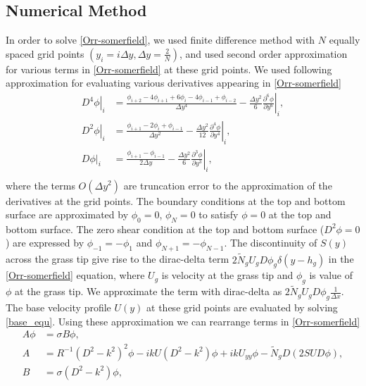 \documentclass[12pt]{report}   %
\newcommand{\del}{\partial}
\newcommand{\Rey}{{R}}
\newcommand{\Ndg}{\tilde{N}_g}
\begin{document}
\subsection{Numerical Method}
  In order to solve \eqref{Orr-somerfield}, we used finite difference method with $N$ equally spaced grid points $(y_i = i\Delta y, \Delta y = \frac{2}{N})$, and used second order approximation for various terms in \eqref{Orr-somerfield} at these grid points. We used following approximation for evaluating various derivatives appearing in \eqref{Orr-somerfield}
  \begin{equation}
  \begin{align}
    \left.{ D^4\phi} \right|_i &= \frac{ \phi_{i+2}-4\phi_{i+1}+6\phi_{i}-4\phi_{i-1}+\phi_{i-2} }{\Delta y^4} - \frac{\Delta y^2}{6} \left. \frac{\del^6 \phi}{\del y^6} \right |_i, \\
    \left. D^2\phi \right|_i &=  \frac{\phi_{i+1} -2\phi_i +\phi_{i-1}}{\Delta y^2} - \left. \frac{\Delta y^2}{12} \frac{\del^4 \phi}{\del y^4} \right|_i ,\\    
    \left. D\phi \right|_i &=  \frac{\phi_{i+1} -\phi_{i-1}}{2\Delta y} - \left. \frac{\Delta y^2}{6} \frac{\del^3 \phi}{\del y^3} \right|_i, \\
    \end{align}
  \end{equation}
where the terms $O(\Delta y^2)$ are truncation error to the approximation of the derivatives at the grid points.
The boundary conditions at the top and bottom surface are approximated by $\phi_0 = 0$,  $\phi_{N} = 0$ to satisfy $\phi=0$ at the top and bottom surface.
The zero shear condition at the top and bottom surface ($D^2\phi=0$) are expressed by $\phi_{-1} = -\phi_{1}$ and $\phi_{N+1} = -\phi_{N-1}$. The discontinuity of $S(y)$ across the grass tip give rise to the dirac-delta term $2\Ndg U_g D\phi_g \delta(y-h_g)$ in the \ref{Orr-somerfield} equation, where $U_g$ is velocity at the grass tip and $\phi_g$ is value of $\phi$ at the grass tip. We approximate the term with dirac-delta as $2\Ndg U_g D\phi_{g} \frac{1}{\Delta x}$.
The base velocity profile $U(y)$ at these grid points are evaluated by solving \eqref{base_equ}. Using these approximation we can rearrange terms in \eqref{Orr-somerfield} 
\begin{equation}
\begin{split}
A\phi &= \sigma B \phi,\\
A &= \Rey^{-1}\left(D^2 -k^{2} \right)^2\phi-ikU \left(D^2-k^2\right)\phi + ik U_{yy}\phi -\Ndg D\left(2 S U D \phi\right),\\
B &= {\sigma} \left(D^2-k^2\right) \phi,
\end{split}
\end{equation}
\end{document}
